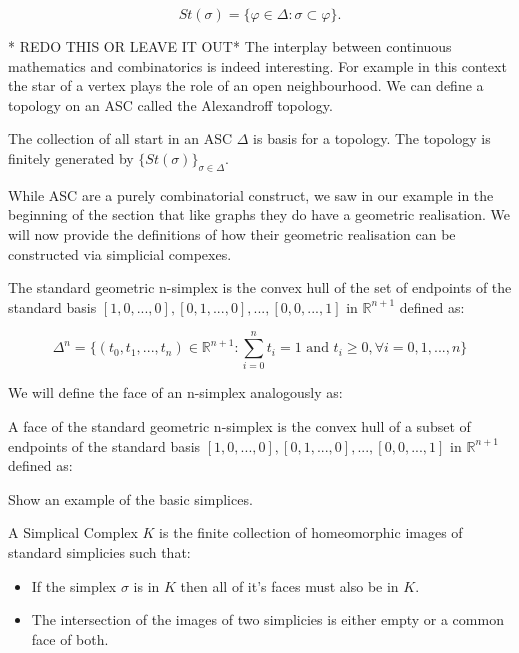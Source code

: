 $$ St(\sigma) =  \{ \varphi \in \Delta : \sigma \subset \varphi \}. $$


* REDO THIS OR LEAVE IT OUT*
The interplay between continuous mathematics and combinatorics is indeed interesting. For example in this context the star of a vertex plays the role of an open neighbourhood. We can define a topology on an ASC called the Alexandroff topology.


\begin{defn} The collection of all start in an ASC $\Delta$ is basis for a topology. The topology is finitely generated by $\{St(\sigma)\}_{\sigma \in \Delta}$.  \end{defn}




While ASC are a purely combinatorial construct, we saw in our example in the beginning of the section that like graphs they do have a geometric realisation. We will now provide the definitions of how their geometric realisation can be constructed via simplicial compexes.

\begin{defn} The standard geometric n-simplex is the convex hull of the set of endpoints of the standard basis $[1, 0, ..., 0], [0, 1, ..., 0], ..., [0, 0, ..., 1]$ in $\mathbb{R}^{n+1}$ defined as: \end{defn}


$$ \Delta^n = \{(t_0, t_1, ..., t_n) \in \mathbb{R}^{n+1} : \sum_{i = 0}^{n} t_i  = 1 \text{ and } t_i \ge 0, \forall i = 0, 1, ..., n \} $$

We will define the face of an n-simplex analogously as:

\begin{defn} A face of the standard geometric n-simplex is the convex hull of a subset of endpoints of the standard basis $[1, 0, ..., 0], [0, 1, ..., 0], ..., [0, 0, ..., 1]$ in $\mathbb{R}^{n+1}$ defined as: \end{defn}

\begin{ex} Show an example of the basic simplices. \end{ex}

A Simplical Complex $K$ is the finite collection of homeomorphic images of standard simplicies such that:

\begin{itemize}
    \item If the simplex $\sigma$ is in $K$ then all of it's faces must also be in $K$.
    \item The intersection of the images of two simplicies is either empty or a common face of both.
\end{itemize}

